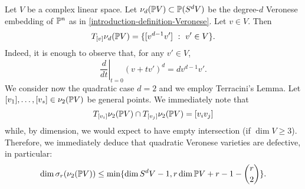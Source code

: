 \begin{example}
\label{geometrySecants-lemma-quadratic_Veronese_defective}
    Let $V$ be a complex linear space. Let $\nu_d(\mathbb{P} V) \subset \mathbb{P}(S^d V)$ be the degree-$d$ Veronese embedding of $\mathbb{P}^n$ as in \ref{introduction-definition-Veronese}. Let $v \in V$. Then
    \[
        T_{[v]}\nu_d(\mathbb{P} V) = \{[v^{d-1}v'] ~:~ v' \in V\}. 
    \]
    Indeed, it is enough to observe that, for any $v' \in V$,
    \[
        \left.\frac{d}{dt}\right|_{t = 0}(v+tv')^{d} = dv^{d-1}v'.
    \]
    We consider now the quadratic case $d = 2$ and we employ Terracini's Lemma. Let $[v_1],\ldots,[v_s] \in \nu_2(\mathbb{P} V)$ be general points. We immediately note that 
    \[
        T_{[v_i]}\nu_2(\mathbb{P} V) \cap T_{[v_j]}\nu_2(\mathbb{P} V) = [v_iv_j]
    \]
    while, by dimension, we would expect to have empty intersection (if $\dim V \geq 3$). Therefore, we immediately deduce that quadratic Veronese varieties are defective, in particular:
    \[
        \dim \sigma_r(\nu_2(\mathbb{P} V)) \leq \min \{\dim S^dV - 1, r\dim \mathbb{P} V + r - 1 - {r \choose 2}\}.  
    \]
\end{example}